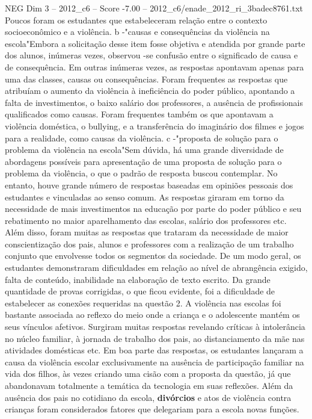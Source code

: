 \begin{textsample}{NEG Dim 3 – 2012\_c6 – Score -7.00 – 2012\_c6/enade\_2012\_ri\_3badec8761.txt}
Poucos foram os estudantes que estabeleceram relação entre o contexto socioeconômico e a violência. b -"causas e consequências da violência na escola"Embora a solicitação desse item fosse objetiva e atendida por grande parte dos alunos, inúmeras vezes, observou -se confusão entre o significado de causa e de consequência.
Em outras inúmeras vezes, as respostas apontavam apenas para uma das classes, causas ou consequências.
Foram frequentes as respostas que atribuíam o aumento da violência à ineficiência do poder público, apontando a falta de investimentos, o baixo salário dos professores, a ausência de profissionais qualificados como causas.
Foram frequentes também os que apontavam a violência doméstica, o bullying, e a transferência do imaginário dos filmes e jogos para a realidade, como causas da violência. c -"proposta de solução para o problema da violência na escola"Sem dúvida, há uma grande diversidade de abordagens possíveis para apresentação de uma proposta de solução para o problema da violência, o que o padrão de resposta buscou contemplar.
No entanto, houve grande número de respostas baseadas em opiniões pessoais dos estudantes e vinculadas ao senso comum.
As respostas giraram em torno da necessidade de mais investimentos na educação por parte do poder público e seu rebatimento no maior aparelhamento das escolas, salário dos professores etc.
Além disso, foram muitas as respostas que trataram da necessidade de maior conscientização dos pais, alunos e professores com a realização de um trabalho conjunto que envolvesse todos os segmentos da sociedade.
De um modo geral, os estudantes demonstraram dificuldades em relação ao nível de abrangência exigido, falta de conteúdo, inabilidade na elaboração de texto escrito.
Da grande quantidade de provas corrigidas, o que ficou evidente, foi a dificuldade de estabelecer as conexões requeridas na questão 2.
A violência nas escolas foi bastante associada ao reflexo do meio onde a criança e o adolescente mantém os seus vínculos afetivos.
Surgiram muitas respostas revelando críticas à intolerância no núcleo familiar, à jornada de trabalho dos pais, ao distanciamento da mãe nas atividades domésticas etc.
Em boa parte das respostas, os estudantes lançaram a causa da violência escolar exclusivamente na ausência de participação familiar na vida dos filhos, às vezes criando uma cisão com a proposta da questão, já que abandonavam totalmente a temática da tecnologia em suas reflexões.
Além da ausência dos pais no cotidiano da escola, \textbf{divórcios} e atos de violência contra crianças foram considerados fatores que delegariam para a escola novas funções.

\end{textsample}
